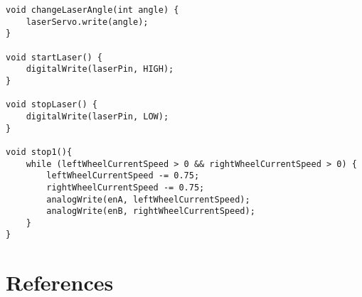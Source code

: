 \documentclass[11pt]{article}
\begin{document}
\begin{lstlisting}[style=myArduino]
void changeLaserAngle(int angle) {
	laserServo.write(angle);
}

void startLaser() {
	digitalWrite(laserPin, HIGH);
}

void stopLaser() {
	digitalWrite(laserPin, LOW);
}

void stop1(){
	while (leftWheelCurrentSpeed > 0 && rightWheelCurrentSpeed > 0) {
		leftWheelCurrentSpeed -= 0.75;
		rightWheelCurrentSpeed -= 0.75;
		analogWrite(enA, leftWheelCurrentSpeed);
		analogWrite(enB, rightWheelCurrentSpeed);
	}
}
	\end{lstlisting}
	
	\section{References}

	\renewcommand{\bibsection}{}
	
	
	
	
	
	
	
\end{document}
